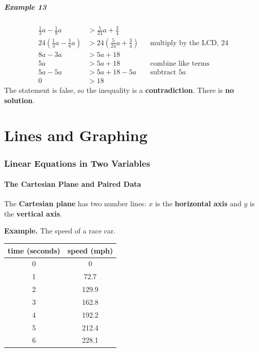 \documentclass[letter]{article}
\newenvironment{keybox}
  {\begin{lrbox}{\keyboxsave}\begin{minipage}{\dimexpr\linewidth-2\fboxsep-2\fboxrule\relax}}
  {\end{minipage}\end{lrbox}\par\noindent\fbox{\usebox{\keyboxsave}}\par}
\newcommand{\chp}{}
\newcommand{\solsec}[1]{\phantomsection\label{sec:\chp ex#1}\subsubsection*{Example #1}}
\begin{document}
\solsec{13}
\begin{align*}
\frac13a-\frac18a&>\frac5{24}a+\frac34\\
24\left(\frac13a-\frac18a\right)&>24\left(\frac5{24}a+\frac34\right)&&\text{multiply by the LCD, $24$}\\
8a-3a&>5a+18\\
5a&>5a+18&&\text{combine like terms}\\
5a-5a&>5a+18-5a&&\text{subtract $5a$}\\
0&>18
\end{align*}
The statement is false, so the inequality is a \textbf{contradiction}. There is \textbf{no solution}.
\part{Lines and Graphing}

\clearpage
\def\chp{lin2}
\lfoot{}
\section{Linear Equations in Two Variables}
\subsection{The Cartesian Plane and Paired Data}

\begin{keybox}
The \textbf{Cartesian plane} has two number lines: $x$ is the \textbf{horizontal axis} and $y$ is the \textbf{vertical axis}.
\end{keybox}

\textbf{Example.} The speed of a race car.

\begin{center}
\begin{tabular}{c|c}
time (seconds) & speed (mph)\\
\hline
0 & 0\\
1 & 72.7\\
2 & 129.9\\
3 & 162.8\\
4 & 192.2\\
5 & 212.4\\
6 & 228.1
\end{tabular}
\qquad
{}
\end{center}
\end{document}
